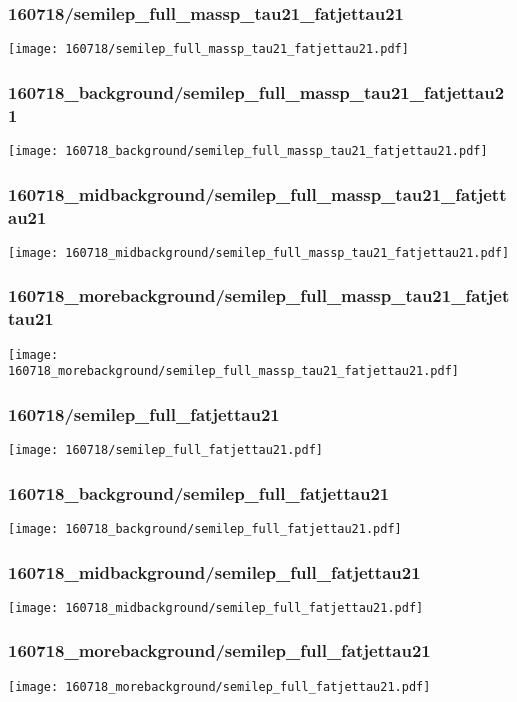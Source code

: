 \begin{frame}
   \frametitle{\small 160718/semilep\_full\_massp\_tau21\_fatjettau21}
   \centering
   \texttt{[image: 160718/semilep\_full\_massp\_tau21\_fatjettau21.pdf]}
\end{frame}

\begin{frame}
   \frametitle{\small 160718\_background/semilep\_full\_massp\_tau21\_fatjettau21}
   \centering
   \texttt{[image: 160718\_background/semilep\_full\_massp\_tau21\_fatjettau21.pdf]}
\end{frame}

\begin{frame}
   \frametitle{\small 160718\_midbackground/semilep\_full\_massp\_tau21\_fatjettau21}
   \centering
   \texttt{[image: 160718\_midbackground/semilep\_full\_massp\_tau21\_fatjettau21.pdf]}
\end{frame}

\begin{frame}
   \frametitle{\small 160718\_morebackground/semilep\_full\_massp\_tau21\_fatjettau21}
   \centering
   \texttt{[image: 160718\_morebackground/semilep\_full\_massp\_tau21\_fatjettau21.pdf]}
\end{frame}

\begin{frame}
   \frametitle{\small 160718/semilep\_full\_fatjettau21}
   \centering
   \texttt{[image: 160718/semilep\_full\_fatjettau21.pdf]}
\end{frame}

\begin{frame}
   \frametitle{\small 160718\_background/semilep\_full\_fatjettau21}
   \centering
   \texttt{[image: 160718\_background/semilep\_full\_fatjettau21.pdf]}
\end{frame}

\begin{frame}
   \frametitle{\small 160718\_midbackground/semilep\_full\_fatjettau21}
   \centering
   \texttt{[image: 160718\_midbackground/semilep\_full\_fatjettau21.pdf]}
\end{frame}

\begin{frame}
   \frametitle{\small 160718\_morebackground/semilep\_full\_fatjettau21}
   \centering
   \texttt{[image: 160718\_morebackground/semilep\_full\_fatjettau21.pdf]}
\end{frame}

